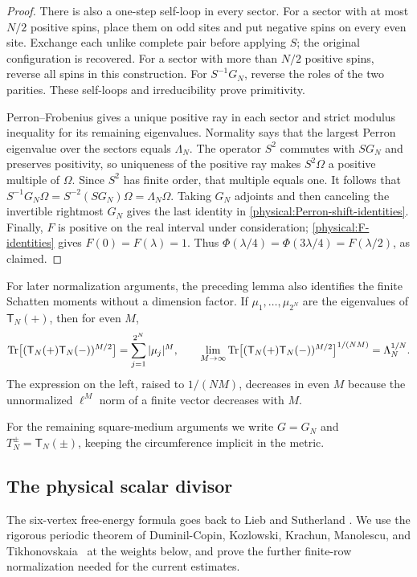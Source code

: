 \begin{proof}
There is also a one-step self-loop in every sector. For a sector with at
most $N/2$ positive spins, place them on odd sites and put negative spins
on every even site. Exchange each unlike complete pair before applying
$S$; the original configuration is recovered. For a sector with more
than $N/2$ positive spins, reverse all spins in this construction.
For $S^{-1}G_N$, reverse the roles of the two parities. These self-loops
and irreducibility prove primitivity.

Perron--Frobenius gives a unique positive ray in each sector and strict
modulus inequality for its remaining eigenvalues. Normality says that
the largest Perron eigenvalue over the sectors equals $\Lambda_N$.
The operator $S^2$ commutes with $SG_N$ and preserves positivity, so
uniqueness of the positive ray makes $S^2\Omega$ a positive multiple of
$\Omega$. Since $S^2$ has finite order, that multiple equals one.
It follows that $S^{-1}G_N\Omega=S^{-2}(SG_N)\Omega
=\Lambda_N\Omega$. Taking $G_N$ adjoints and then canceling the
invertible rightmost $G_N$ gives the last identity in
\eqref{physical:Perron-shift-identities}.
Finally, $F$ is positive on the real interval under consideration;
\eqref{physical:F-identities} gives $F(0)=F(\lambda)=1$.
Thus $\Phi(\lambda/4)=\Phi(3\lambda/4)=F(\lambda/2)$, as claimed.
\end{proof}

For later normalization arguments, the preceding lemma also identifies
the finite Schatten moments without a dimension factor. If
$\mu_1,\ldots,\mu_{2^N}$ are the eigenvalues of $\mathsf T_N(+)$, then
for even $M$,
\begin{equation}\label{physical:Schatten-moment}
 \operatorname{Tr}\bigl[(\mathsf T_N(+)\mathsf T_N(-))^{M/2}\bigr]
       =\sum_{j=1}^{2^N}|\mu_j|^M,
 \qquad
 \lim_{M\to\infty}
 \operatorname{Tr}\bigl[(\mathsf T_N(+)\mathsf T_N(-))^{M/2}\bigr]^{1/(NM)}
       =\Lambda_N^{1/N}.
\end{equation}
The expression on the left, raised to $1/(NM)$, decreases in even $M$
because the unnormalized $\ell^M$ norm of a finite vector decreases
with $M$.

For the remaining square-medium arguments we write \(G=G_N\) and
\(T_N^\pm=\mathsf T_N(\pm)\), keeping the circumference implicit
in the metric.

\subsection{The physical scalar divisor}

The six-vertex free-energy formula goes back to Lieb and Sutherland
\cite{Lieb1967FModel,Sutherland1967SixVertex}.  We use the rigorous
periodic theorem of Duminil-Copin, Kozlowski, Krachun, Manolescu, and
Tikhonovskaia~\cite[Theorem~1]{SixVertex2022} at the weights below, and
prove the further finite-row normalization needed for the current estimates.

